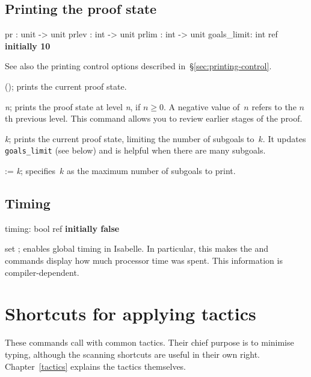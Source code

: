 \subsection{Printing the proof state}\label{sec:goals-printing}
\begin{ttbox} 
pr    : unit -> unit
prlev : int -> unit
prlim : int -> unit
goals_limit: int ref \hfill{\bf initially 10}
\end{ttbox}
See also the printing control options described 
in~\S\ref{sec:printing-control}. 
\begin{ttdescription}
\item[\ttindexbold{pr}();] 
prints the current proof state.

\item[\ttindexbold{prlev} {\it n};] 
prints the proof state at level {\it n}, if $n\geq0$.  A negative value
of~$n$ refers to the $n$th previous level.  This command allows
you to review earlier stages of the proof.

\item[\ttindexbold{prlim} {\it k};] 
prints the current proof state, limiting the number of subgoals to~$k$.  It
updates \texttt{goals_limit} (see below) and is helpful when there are many
subgoals. 

\item[\ttindexbold{goals_limit} := {\it k};] 
specifies~$k$ as the maximum number of subgoals to print.
\end{ttdescription}


\subsection{Timing}
\begin{ttbox} 
timing: bool ref \hfill{\bf initially false}
\end{ttbox}

\begin{ttdescription}
\item[set \ttindexbold{timing};] enables global timing in Isabelle.  In
  particular, this makes the  and  commands
  display how much processor time was spent.  This information is
  compiler-dependent.
\end{ttdescription}


\section{Shortcuts for applying tactics}
These commands call  with common tactics.  Their chief purpose
is to minimise typing, although the scanning shortcuts are useful in their
own right.  Chapter~\ref{tactics} explains the tactics themselves.

